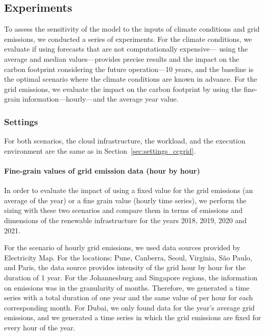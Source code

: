 \subsection{Experiments}

To assess the sensitivity of the model to the inputs of climate conditions and grid emissions, we conducted a series of experiments. For the climate conditions, we evaluate if using forecasts that are not computationally expensive--- using the average and median values---provides precise results and the impact on the carbon footprint considering the future operation---10 years, and the baseline is the optimal scenario where the climate conditions are known in advance. For the grid emissions, we evaluate the impact on the carbon footprint by using the fine-grain information---hourly---and the average year value.


\subsubsection{Settings}


For both scenarios, the cloud infrastructure, the workload, and the execution environment are the same as in Section~\ref{sec:settings_ccgrid}.


\paragraph{Fine-grain values of grid emission data (hour by hour)}

In order to evaluate the impact of using a fixed value for the grid emissions (an average of the year)  or a fine grain value (hourly time series), we perform the sizing with these two scenarios and compare them in terms of  emissions and dimensions of the renewable infrastructure for the years 2018, 2019, 2020 and 2021.

For the scenario of hourly grid emissions, we used data sources provided by Electricity Map. For the locations: Pune, Canberra, Seoul, Virginia, São Paulo, and Paris, the data source provides  intensity of the grid hour by hour for the duration of 1 year. For the Johannesburg and Singapore regions, the information on  emissions was in the granularity of months. Therefore, we generated a time series with a total duration of one year and the same value of  per hour for each corresponding month. For Dubai, we only found data for the year's average grid  emissions, and we generated a time series in which the grid emissions are fixed for every hour of the year.


